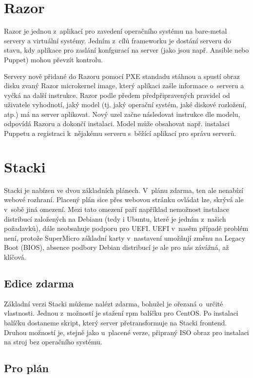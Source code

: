 \section{Razor}

Razor \cite{razor} je jednou z~aplikací pro zavedení operačního systému na bare-metal servery a virtuální systémy. Jedním z~cílů frameworku je dostání serveru do stavu, kdy aplikace pro zaslání konfgurací na server (jako jsou např. Ansible nebo Puppet) mohou převzít kontrolu.

Servery nově přidané do Razoru pomocí PXE standadu stáhnou a spustí obraz disku zvaný Razor microkernel image, který aplikaci zašle informace o~serveru a vyčká na další instrukce. Razor podle předem předpřipravených pravidel od uživatele vyhodnotí, jaký model (tj. jaký operační systém, jaké diskové rozložení, atp.) má na server aplikovat. Nový uzel začne následovat instrukce dle modelu, odpovídá Razoru a dokončí instalaci. Model může obsahovat např. instalaci Puppetu a registraci k~nějakému serveru s~běžící aplikací pro správu serverů.

\section{Stacki}

Stacki \cite{stacki} je nabízen ve dvou základních plánech. V~plánu zdarma, ten ale nenabízí webové rozhraní. Placený plán sice přes webovou stránku ovládat lze, skrývá ale v~sobě jiná omezení. Mezi tato omezení paří například nemožnost instalace distribucí založených na Debianu (tedy i Ubuntu, které je jedním z~našich požadavků), dále neobsahuje podporu pro UEFI. UEFI v~nasěm případě problém není, protože SuperMicro základní karty v~nastavení umožňují změnu na Legacy Boot (BIOS), absence podbory Debian distribucí je ale pro nás závážná, až klíčová.

\subsection{Edice zdarma}

Základní verzi Stacki můžeme nalézt zdarma, bohužel je ořezaná o~určité vlastnosti. Jednou z~možností je stažení rpm balíčku pro CentOS. Po instalaci balíčku dostaneme skript, který server přetransformuje na Stacki frontend. Druhou možností je, stejně jako u~placené verze, připraný ISO obraz pro instalaci na stroj bez operačního systému.

\subsection{Pro plán}

